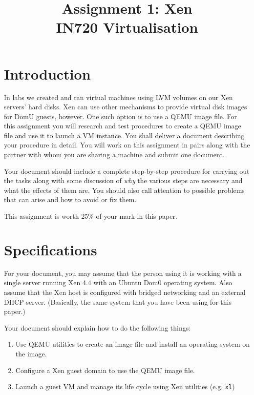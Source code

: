 \documentclass{article}
\begin{document}
\title{Assignment 1: Xen \\ IN720 Virtualisation}
\date{}
\maketitle

\section*{Introduction}
In labs we created and ran virtual machines using LVM volumes on our Xen servers' hard disks. Xen can use other mechanisms to provide virtual disk images for DomU guests, however. One such option is to use a QEMU image file. For this assignment you will research and test procedures to create a QEMU image file and use it to launch a VM instance. You shall deliver a document describing your procedure in detail. You will work on this assignment in pairs along with the partner with whom you are sharing a machine and submit one document.

Your document should include a complete step-by-step procedure for carrying out the tasks along with some discussion
of \emph{why} the various steps are necessary and what the effects of them are. You should also call attention to 
possible problems that can arise and how to avoid or fix them.

This assignment is worth 25\% of your mark in this paper.

\section{Specifications}

For your document, you may assume that the person using it is working with a single server running Xen 4.4 with an 
Ubuntu Dom0 operating system. Also assume that the Xen host
is configured with bridged networking and an external DHCP server. (Basically, the same system that you have been using for this paper.)

Your document should explain how to do the following things:

\begin{enumerate}
	\item Use QEMU utilities to create an image file and install an operating system on the image.
	\item Configure a Xen guest domain to use the QEMU image file.
	\item Launch a guest VM and manage its life cycle using Xen utilities (e.g. \texttt{xl})
\end{enumerate}
\end{document}
